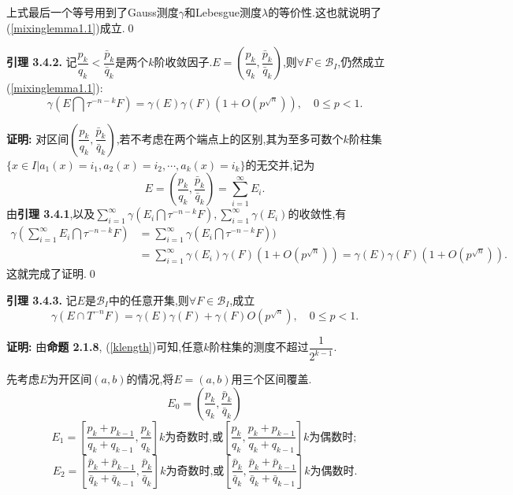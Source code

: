 上式最后一个等号用到了Gauss测度$\gamma$和Lebesgue测度$\lambda$的等价性.这也就说明了(\ref{mixinglemma1.1})成立.\qed
\par
\textbf{引理 3.4.2. }\textsuperscript{\cite{Liu_Peng,Mixing_lemma}}
记$\dfrac{p_k}{q_k}<\dfrac{\bar p_k}{\bar q_k}$是两个$k$阶收敛因子.$E=\left(\dfrac{p_k}{q_k},\dfrac{\bar p_k}{\bar q_k}\right)$,则$\forall F\in\mathcal{B}_I$,仍然成立(\ref{mixinglemma1.1}):
$$\gamma(E\bigcap \tau^{-n-k}F)=\gamma(E)\gamma(F)(1+O(p^{\sqrt{n}})),\quad 0\leqslant p<1.$$
\par\textbf{证明:  }
对区间$\left(\dfrac{p_k}{q_k},\dfrac{\bar p_k}{\bar q_k}\right)$,若不考虑在两个端点上的区别,其为至多可数个$k$阶柱集$\{x\in I|a_1(x)=i_1,a_2(x)=i_2,\cdots,a_k(x)=i_k\}$的无交并,记为
$$E=\left(\dfrac{p_k}{q_k},\dfrac{\bar p_k}{\bar q_k}\right)=\sum\limits_{i=1}^{\infty}E_i.$$
由\textbf{引理 3.4.1},以及$\sum\limits_{i=1}^{\infty}\gamma(E_i\bigcap\tau^{-n-k}F),\sum\limits_{i=1}^{\infty}\gamma(E_i)$的收敛性,有
\begin{align*}
    \gamma(\sum\limits_{i=1}^{\infty}E_i\bigcap\tau^{-n-k}F) & =\sum\limits_{i=1}^{\infty}\gamma(E_i\bigcap\tau^{-n-k}F))                                                \\
                                                             & =\sum\limits_{i=1}^{\infty}\gamma(E_i)\gamma(F)(1+O(p^{\sqrt{n}}))=\gamma(E)\gamma(F)(1+O(p^{\sqrt{n}})).
\end{align*}
这就完成了证明.\qed
\par
\textbf{引理 3.4.3.}\textsuperscript{\cite{Liu_Peng,Mixing_lemma}}
记$E$是$\mathcal{B}_I$中的任意开集,则$\forall F\in\mathcal{B}_I$,成立
\begin{equation}\label{mixinglemma3.1}
    \gamma(E\cap T^{-n}F)=\gamma(E)\gamma(F)+\gamma(F)O(p^{\sqrt{n}}),\quad 0\leqslant p<1.
\end{equation}
\par
\textbf{证明:  }
由\textbf{命题 2.1.8}, (\ref{klength})可知,任意$k$阶柱集的测度不超过$\dfrac{1}{2^{k-1}}$.\par
先考虑$E$为开区间$(a,b)$的情况,将$E=(a,b)$用三个区间覆盖.
$$E_0=\left(\dfrac{p_k}{q_k},\dfrac{\bar p_k}{\bar q_k}\right)$$
$$E_1=\left[\dfrac{p_k+p_{k-1}}{q_k+q_{k-1}},\dfrac{p_k}{q_k}\right]k\text{为奇数时,或}\left[\dfrac{p_k}{q_k},\dfrac{p_k+p_{k-1}}{q_k+q_{k-1}}\right]k\text{为偶数时};$$
$$E_2=\left[\dfrac{\bar p_k+\bar p_{k-1}}{\bar q_k+\bar q_{k-1}},\dfrac{\bar p_k}{\bar q_k}\right]k\text{为奇数时,或}\left[\dfrac{\bar p_k}{\bar q_k},\dfrac{\bar p_k+\bar p_{k-1}}{\bar q_k+\bar q_{k-1}}\right]k\text{为偶数时}.$$
